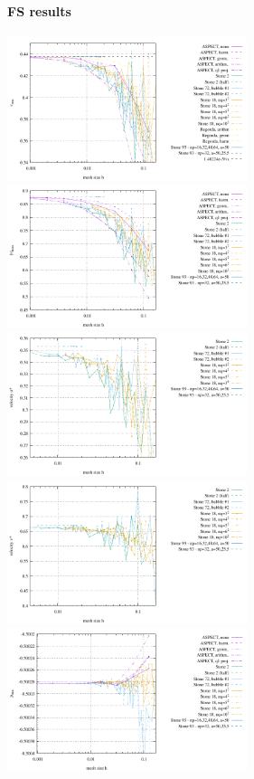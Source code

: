 \newpage
\paragraph{FS results}

\begin{center}
\includegraphics[width=7cm]{images/stokes_sphere2D/vrms_FS}
\includegraphics[width=7cm]{images/stokes_sphere2D/max_vel_FS}\\
\includegraphics[width=7cm]{images/stokes_sphere2D/max_u_FS}
\includegraphics[width=7cm]{images/stokes_sphere2D/max_v_FS}\\
\includegraphics[width=7cm]{images/stokes_sphere2D/pressure_min_FS}

\end{center}
